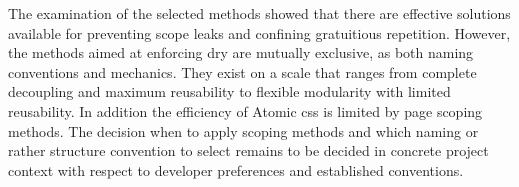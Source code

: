 The examination of the selected methods showed that there are effective solutions available for preventing scope leaks and confining gratuitious repetition.
However, the methods aimed at enforcing \gls{dry} are mutually exclusive, as both naming conventions and mechanics.
They exist on a scale that ranges from complete decoupling and maximum reusability to flexible modularity with limited reusability.
In addition the efficiency of Atomic \gls{css} is limited by page scoping methods.
The decision when to apply scoping methods and which naming or rather structure convention to select remains to be decided in concrete project context with respect to developer preferences and established conventions.

